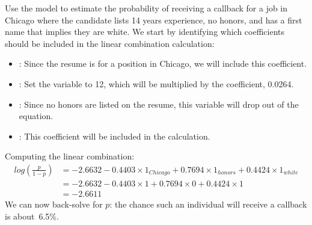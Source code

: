 \begin{examplewrap}
\begin{nexample}{Use the model to estimate the probability
    of receiving a callback for a job in Chicago
    where the candidate lists 14 years experience,
    no honors, and has a first name that implies
    they are white.}
  \label{exampleForResumeAndWhiteQuantified}%
  We start by identifying which coefficients
  should be included in the linear combination calculation:
  \begin{itemize}
  \setlength{\itemsep}{0mm}
  \item {}:
      Since the resume is for a position in Chicago,
      we will include this coefficient.
  \item {}:
      Set the variable to 12,
      which will be multiplied by the coefficient, 0.0264.
  \item {}:
      Since no honors are listed on the resume,
      this variable will drop out of the equation.
  \item {}:
      This coefficient will be included in the calculation.
  \end{itemize}
  Computing the linear combination:
  \begin{align*}
  log\left(\frac{p}{1 - p}\right)
    &= - 2.6632
        - 0.4403 \times 1_{Chicago}
        + 0.7694 \times 1_{honors}
        + 0.4424 \times 1_{white} \\
    &= - 2.6632
        - 0.4403 \times 1
        + 0.7694 \times 0
        + 0.4424 \times 1 \\
    &= - 2.6611
  \end{align*}
  We can now back-solve for $p$:
  the chance such an individual will receive
  a callback is about~6.5\%.
\end{nexample}
\end{examplewrap}

